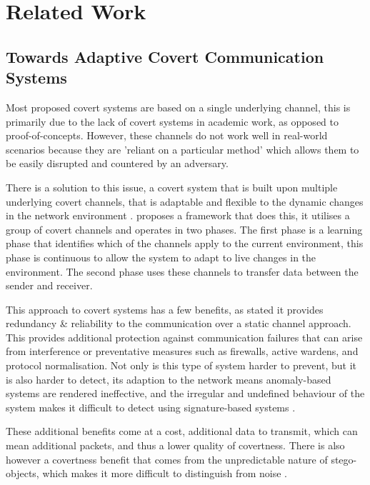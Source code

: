 \chapter{Related Work}
\label{ch:related_work}

\section{Towards Adaptive Covert Communication Systems}

Most proposed covert systems are based on a single underlying channel, this is primarily due to the lack of covert systems in academic work, as opposed to proof-of-concepts. However, these channels do not work well in real-world scenarios because they are 'reliant on a particular method' \citep{TWACCS} which allows them to be easily disrupted and countered by an adversary.

There is a solution to this issue, a covert system that is built upon multiple underlying covert channels, that is adaptable and flexible to the dynamic changes in the network environment \citep{TWACCS}. \cite{TWACCS} proposes a framework that does this, it utilises a group of covert channels and operates in two phases. The first phase is a learning phase that identifies which of the channels apply to the current environment, this phase is continuous to allow the system to adapt to live changes in the environment. The second phase uses these channels to transfer data between the sender and receiver.

This approach to covert systems has a few benefits, as stated it provides redundancy \& reliability \citep{TWACCS} to the communication over a static channel approach. This provides additional protection against communication failures that can arise from interference or preventative measures such as firewalls, active wardens, and protocol normalisation. Not only is this type of system harder to prevent, but it is also harder to detect, its adaption to the network means anomaly-based systems are rendered ineffective, and the irregular and undefined behaviour of the system makes it difficult to detect using signature-based systems \citep{TWACCS}.

These additional benefits come at a cost, additional data to transmit, which can mean additional packets, and thus a lower quality of covertness. There is also however a covertness benefit that comes from the unpredictable nature of stego-objects, which makes it more difficult to distinguish from noise \citep{ECopSSUOCC}.

